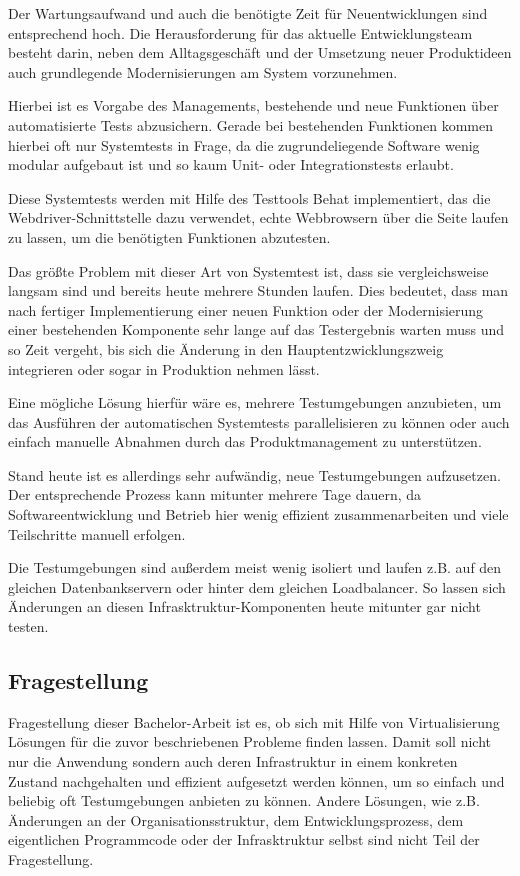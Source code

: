 Der Wartungsaufwand und auch die benötigte Zeit für Neuentwicklungen sind entsprechend hoch. Die Herausforderung für das aktuelle Entwicklungsteam besteht darin, neben dem Alltagsgeschäft und der Umsetzung neuer Produktideen auch grundlegende Modernisierungen am System vorzunehmen.

Hierbei ist es Vorgabe des Managements, bestehende und neue Funktionen über automatisierte Tests abzusichern. Gerade bei bestehenden Funktionen kommen hierbei oft nur Systemtests in Frage, da die zugrundeliegende Software wenig modular aufgebaut ist und so kaum Unit- oder Integrationstests erlaubt.

Diese Systemtests werden mit Hilfe des Testtools Behat implementiert, das die Webdriver-Schnittstelle dazu verwendet, echte Webbrowsern über die Seite laufen zu lassen, um die benötigten Funktionen abzutesten.

Das größte Problem mit dieser Art von Systemtest ist, dass sie vergleichsweise langsam sind und bereits heute mehrere Stunden laufen. Dies bedeutet, dass man nach fertiger Implementierung einer neuen Funktion oder der Modernisierung einer bestehenden Komponente sehr lange auf das Testergebnis warten muss und so Zeit vergeht, bis sich die Änderung in den Hauptentzwicklungszweig integrieren oder sogar in Produktion nehmen lässt.

Eine mögliche Lösung hierfür wäre es, mehrere Testumgebungen anzubieten, um das Ausführen der automatischen Systemtests parallelisieren zu können oder auch einfach manuelle Abnahmen durch das Produktmanagement zu unterstützen.

Stand heute ist es allerdings sehr aufwändig, neue Testumgebungen aufzusetzen. Der entsprechende Prozess kann mitunter mehrere Tage dauern, da Softwareentwicklung und Betrieb hier wenig effizient zusammenarbeiten und viele Teilschritte manuell erfolgen.

Die Testumgebungen sind außerdem meist wenig isoliert und laufen z.B. auf den gleichen Datenbankservern oder hinter dem gleichen Loadbalancer. So lassen sich Änderungen an diesen Infrasktruktur-Komponenten heute mitunter gar nicht testen.

\subsection{Fragestellung}

Fragestellung dieser Bachelor-Arbeit ist es, ob sich mit Hilfe von Virtualisierung Lösungen für die zuvor beschriebenen Probleme finden lassen. Damit soll nicht nur die Anwendung sondern auch deren Infrastruktur in einem konkreten Zustand nachgehalten und effizient aufgesetzt werden können, um so einfach und beliebig oft Testumgebungen anbieten zu können. Andere Lösungen, wie z.B. Änderungen an der Organisationsstruktur, dem Entwicklungsprozess, dem eigentlichen Programmcode oder der Infrasktruktur selbst sind nicht Teil der Fragestellung.

